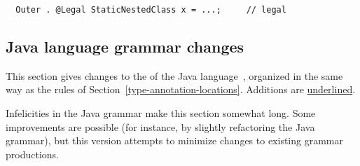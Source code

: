 \documentclass[10pt]{article}
\begin{document}
\preverbnegspace
\begin{Verbatim}
  Outer . @Legal StaticNestedClass x = ...;     // legal
\end{Verbatim}
\preverbnegspace


\subsection{Java language grammar changes\label{grammar}}

This section
gives changes to the  of the Java
language~\cite[ch.~18]{GoslingJSBB2012}, organized in the same way as
the rules of Section~\ref{type-annotation-locations}.
Additions are \underline{underlined}.

Infelicities in the Java grammar make this section somewhat long.
Some improvements are
possible (for instance, by slightly refactoring the Java grammar), but this
version attempts to minimize changes to existing grammar productions.





\newcommand{\term}[1]{\code{#1}}         %
\newcommand{\nt}[1]{\emph{#1}}           %
\newcommand{\opt}[1]{\emph{[}#1\emph{]}} %
\newcommand{\multi}[1]{\emph{\{}#1\emph{\}}} %
\newcommand{\alt}[1]{\emph{(}#1\emph{)}} %
\newcommand{\altor}[1]{\ensuremath{\mathit{|}}} %
\newcommand{\new}[1]{\underline{#1}}     %

\newcommand{\basictypename}{\alt{ \term{byte} \altor{} \term{short} \altor{} \term{char} \altor{} \term{int} \altor{} \term{long} \altor{} \term{float} \altor{} \term{double} \altor{} \term{boolean} }}
\end{document}
